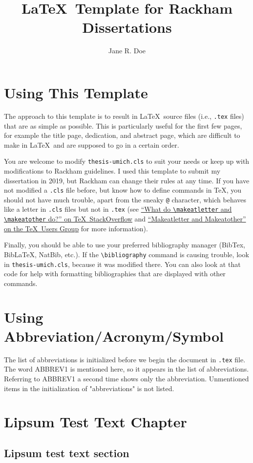 \documentclass[thesis]{thesis-umich}
\title{\LaTeX~Template for Rackham Dissertations}
\author{Jane R. Doe}
\begin{document}
\chapter{Using This Template}
The approach to this template is to result in \LaTeX~source files (i.e.,
\texttt{.tex} files) that are as simple as possible.  This is particularly
useful for the first few pages, for example the title page, dedication, and
abstract page, which are difficult to make in \LaTeX~and are supposed to go in
a certain order.

You are welcome to modify \texttt{thesis-umich.cls} to suit your needs or keep
up with modifications to Rackham guidelines. I used this template to submit my
dissertation in 2019, but Rackham can change their rules at any time. If you
have not modified a \texttt{.cls} file before, but know how to define commands
in \TeX, you should not have much trouble, apart from the sneaky \verb=@=
character, which behaves like a letter in \texttt{.cls} files but not in
\texttt{.tex} (see \href{https://tex.stackexchange.com/q/8351/21027}{``What do
  \texttt{\textbackslash makeatletter} and \texttt{\textbackslash makeatother}
do?'' on \TeX\ StackOverflow} and
\href{https://tug.org/pipermail/tugindia/2002-January/000178.html}{``Makeatletter
and Makeatother'' on the \TeX\ Users Group} for more information).

Finally, you should be able to use your preferred bibliography manager (BibTex, BibLaTeX, NatBib, etc.). If the \texttt{\textbackslash bibliography} command is causing trouble, look in \texttt{thesis-umich.cls}, because it was modified there. You can also look at that code for help with formatting bibliographies that are displayed with other commands.

\chapter{Using Abbreviation/Acronym/Symbol}
The list of abbreviations is initialized before we begin the document in \texttt{.tex} file. The word \ac{ABBREV1} is mentioned here, so it appears in the list of abbreviations. Referring to \ac{ABBREV1} a second time shows only the abbreviation. Unmentioned items in the initialization of "abbreviations" is not listed. 
\chapter{Lipsum Test Text Chapter}
\section{Lipsum test text section}
\lipsum[1]
\end{document}
